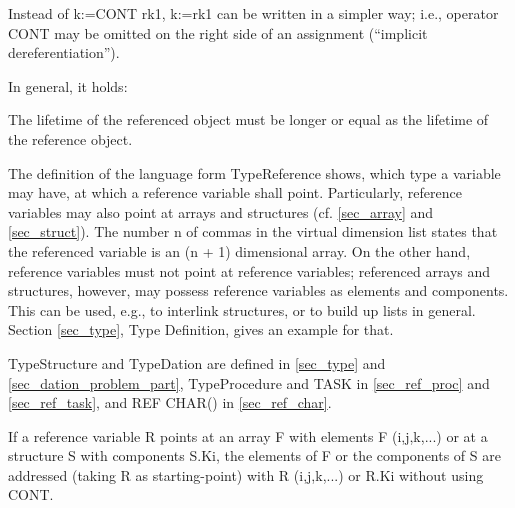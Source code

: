 Instead of k:=CONT rk1, k:=rk1 can be written in a simpler way; i.e.,
operator CONT may be omitted on the right side of an assignment
(``implicit dereferentiation'').

In general, it holds:




The lifetime of the referenced object must be longer or equal as
the lifetime of the reference object.

The definition of the language form TypeReference shows, which type a
variable may have, at which a reference variable shall point.
Particularly, reference variables may also point at arrays and
structures (cf. \ref{sec_array} and \ref{sec_struct}).
 The number n of commas in the virtual
dimension list states that the referenced variable is an (n + 1)
dimensional array. On the other hand, reference variables must not point
at reference variables; referenced arrays and structures, however, may
possess reference variables as elements and components. This can be
used, e.g., to interlink structures, or to build up lists in general.
Section \ref{sec_type}, Type Definition, gives an example for that.

TypeStructure and TypeDation are defined in \ref{sec_type} and 
\ref{sec_dation_problem_part}, TypeProcedure and 
TASK in \ref{sec_ref_proc} and \ref{sec_ref_task},
 and REF CHAR() in 
 \ref{sec_ref_char}.


If a reference variable R points at an array F with elements F
(i,j,k,...) or at a structure S with components S.Ki, the elements of F
or the components of S are addressed (taking R as starting-point) with R
(i,j,k,...) or R.Ki without using CONT.

